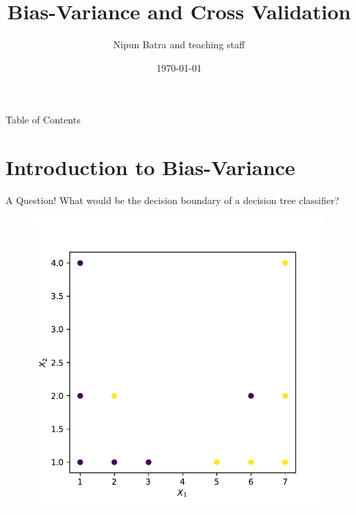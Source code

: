 \documentclass{beamer}
\title{Bias-Variance and Cross Validation}
\date{\today}
\author{Nipun Batra and teaching staff}
\institute{IIT Gandhinagar}
\begin{document}
\maketitle

\begin{frame}{Table of Contents}
\tableofcontents
\end{frame}

\section{Introduction to Bias-Variance}

\begin{frame}{A Question!}
	What would be the decision boundary of a decision tree classifier? 
		
	\begin{figure}
		\centering
	\includegraphics[scale=0.55]{dataset-1}
	\end{figure}


	\end{frame}
\end{document}
